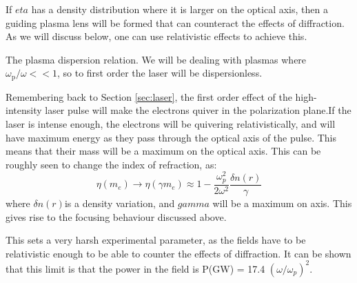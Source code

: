 \documentclass[12pt,letter]{article}
\renewcommand{\footnotesize}{\scriptsize}
\begin{document}
If $eta$ has a density distribution where it is larger on the optical axis, then
a guiding plasma lens will be formed that can counteract the effects of
diffraction. As we will discuss below, one can use relativistic effects to
achieve this. 
\begin{marginfigure}
    \caption{\label{fig:dispersion}The plasma dispersion relation. We will be
        dealing with plasmas where $\omega_\mathrm{p}/\omega << 1$, so to
    first order the laser will be dispersionless. }
    \end{marginfigure}

Remembering back to Section \ref{sec:laser}, the first order effect of the
high-intensity laser pulse will make the electrons quiver in the polarization
plane.If the laser is intense enough, the electrons will be quivering
relativistically, and will have maximum energy as they pass through the optical
axis of the pulse. This means that their mass will be a maximum on the optical
axis. This can be roughly seen to change the index of refraction, as:
\begin{equation}
    \label{eq:indexrel}
    \eta(m_e) \rightarrow \eta(\gamma m_e) \approx
1-\frac{\omega_p^2}{2\omega^2}\frac{\delta n(r)}{\gamma}
\end{equation}
where $\delta n(r) $is a density variation, and $gamma$ will be a maximum on
axis.\cite{esarey} This gives rise to the focusing behaviour
discussed above.

This sets a very harsh experimental parameter, as the fields have to be
relativistic enough to be able to counter the effects of diffraction. It can be
shown that this limit is that the power in the field is P(GW) = 17.4
$(\omega/\omega_p)^2$\cite{esarey}.
\end{document}
